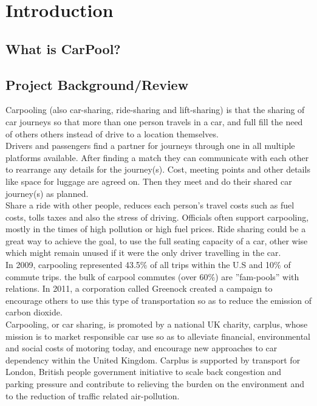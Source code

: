 \chapter{Introduction} \label{chap:intro}

\section*{What is CarPool?}

\section{Project Background/Review}
\justify
Carpooling (also car-sharing, ride-sharing and lift-sharing) is that the sharing of car journeys so that more than one person travels in a car, and full fill the need of others others instead of drive to a location themselves.\\ 

Drivers and passengers ﬁnd a partner for journeys through one in all multiple platforms available. After ﬁnding a match they can communicate with each other to rearrange any details for the journey(s). Cost, meeting points and other details like space for luggage are agreed on. Then they meet and do their shared car journey(s) as planned.\\

Share a ride with other people, reduces each person’s travel costs such as fuel costs, tolls taxes and also the stress of driving. Officials often support carpooling, mostly in the times of high pollution or high fuel prices. Ride sharing could be a great way to achieve the goal, to use the full seating capacity of a car, other wise which might remain unused if it were the only driver travelling in the car.\\

In 2009, carpooling represented 43.5\% of all trips within the U.S and 10\% of commute trips. the bulk of carpool commutes (over 60\%) are ”fam-pools” with relations. In 2011, a corporation called Greenock created a campaign to encourage others to use this type of transportation so as to reduce the emission of carbon dioxide.\\

Carpooling, or car sharing, is promoted by a national UK charity, carplus, whose mission is to market responsible car use so as to alleviate ﬁnancial, environmental and social costs of motoring today, and encourage new approaches to car dependency within the United Kingdom. Carplus is supported by transport for London, British people government initiative to scale back congestion and parking pressure and contribute to relieving the burden on the environment and to the reduction of traﬃc related air-pollution.\\

